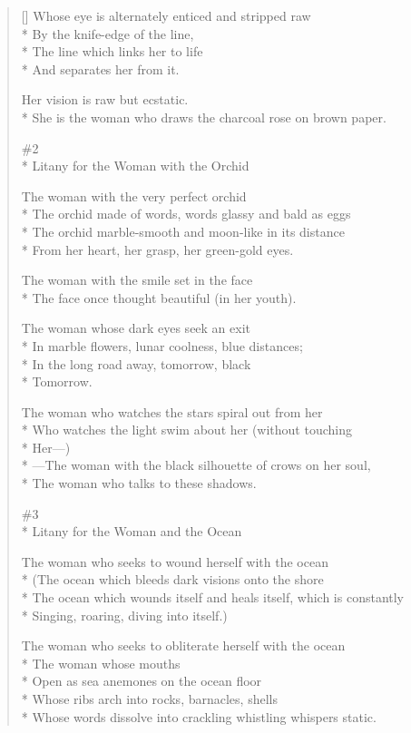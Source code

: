 \begin{verse}[\versewidth]
Whose eye is alternately enticed and stripped raw\\*
By the knife-edge of the line,\\*
The line which links her to life\\*
And separates her from it.

Her vision is raw but ecstatic.\\*
She is the woman who draws the charcoal rose on brown paper.

\#2\\*
Litany for the Woman with the Orchid

The woman with the very perfect orchid\\*
The orchid made of words, words glassy and bald as eggs\\*
The orchid marble-smooth and moon-like in its distance\\*
From her heart, her grasp, her green-gold eyes.

The woman with the smile set in the face\\*
The face once thought beautiful (in her youth).

The woman whose dark eyes seek an exit\\*
In marble flowers, lunar coolness, blue distances;\\*
In the long road away, tomorrow, black\\*
Tomorrow.

The woman who watches the stars spiral out from her\\*
Who watches the light swim about her (without touching\\*
Her---)\\*
             ---The woman with the black silhouette of crows on her soul,\\*
The woman who talks to these shadows.

\#3\\*
Litany for the Woman and the Ocean

The woman who seeks to wound herself with the ocean\\*
(The ocean which bleeds dark visions onto the shore\\*
The ocean which wounds itself and heals itself, which is constantly\\*
Singing, roaring, diving into itself.)

The woman who seeks to obliterate herself with the ocean\\*
The woman whose mouths\\*
Open as sea anemones on the ocean floor\\*
Whose ribs arch into rocks, barnacles, shells\\*
Whose words dissolve into crackling whistling whispers static.


\end{verse}
